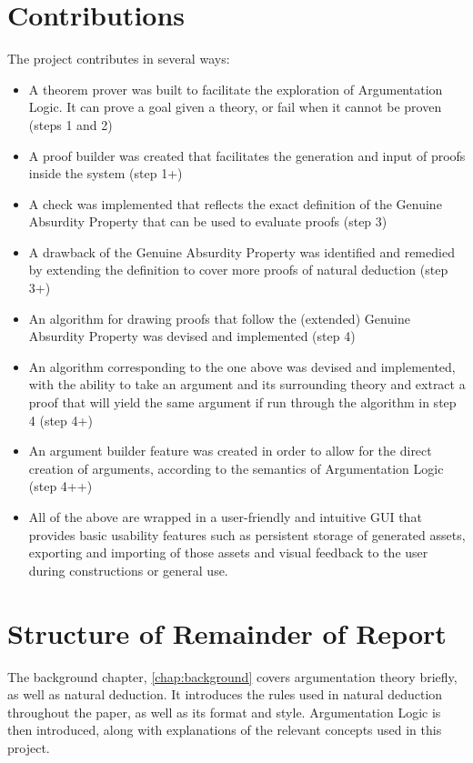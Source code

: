 \documentclass[11pt,twoside,a4paper]{report}
\begin{document}
\section{Contributions}
The project contributes in several ways:
\begin{itemize}
\item
A theorem prover was built to facilitate the exploration of Argumentation Logic. It can prove a goal given a theory, or fail when it cannot be proven (steps 1 and 2)
\item
A proof builder was created that facilitates the generation and input of proofs inside the system (step 1+)
\item
A check was implemented that reflects the exact definition of the Genuine Absurdity Property that can be used to evaluate proofs (step 3)
\item
A drawback of the Genuine Absurdity Property was identified and remedied by extending the definition to cover more proofs of natural deduction (step 3+)
\item
An algorithm for drawing proofs that follow the (extended) Genuine Absurdity Property was devised and implemented (step 4)
\item
An algorithm corresponding to the one above was devised and implemented, with the ability to take an argument and its surrounding theory and extract a proof that will yield the same argument if run through the algorithm in step 4 (step 4+)
\item
An argument builder feature was created in order to allow for the direct creation of arguments, according to the semantics of Argumentation Logic (step 4++)
\item
All of the above are wrapped in a user-friendly and intuitive GUI that provides basic usability features such as persistent storage of generated assets, exporting and importing of those assets and visual feedback to the user during constructions or general use.
\end{itemize}

\section{Structure of Remainder of Report}
The background chapter, \autoref{chap:background} covers argumentation theory briefly, as well as natural deduction. It introduces the rules used in natural deduction throughout the paper, as well as its format and style. Argumentation Logic is then introduced, along with explanations of the relevant concepts used in this project.
\end{document}
